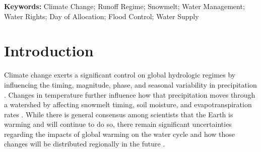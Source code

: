 \documentclass[11pt,letterpaper]{article}
\begin{document}
\textbf{Keywords:} Climate Change; Runoff Regime; Snowmelt; Water Management; Water Rights; Day of Allocation; Flood Control; Water Supply











\section{Introduction}
Climate change exerts a significant control on global hydrologic regimes by influencing the timing, magnitude, phase, and seasonal variability in precipitation \citep{Mote:2005bv,Regonda:2005bl,Knowles:2006jc,Haddeland:2014kx}. Changes in temperature further influence how that precipitation moves through a watershed by affecting snowmelt timing, soil moisture, and evapotranspiration rates \citep{Barnett:2005ci,Li:2017jn}. While there is general consensus among scientists that the Earth is warming and will continue to do so, there remain significant uncertainties regarding the impacts of global warming on the water cycle and how those changes will be distributed regionally in the future \citep{Huntington:2006tl,Turral:2011uj}.
\end{document}
